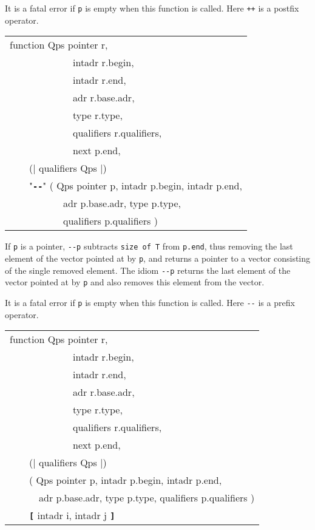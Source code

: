 \documentclass[12pt]{article}
\makeatletter
\newcommand{\TT}[1]{{\tt \bfseries #1}}
\newcommand{\ttmkey}[2]{\TT{#1}\index{#1@{\tt #1}!#2}}
\newcommand{\ttmindex}[2]{\index{#1@{\tt #1}!#2}}
\newenvironment{indpar}[1][0.3in]%
	{\begin{list}{}%
		     {\setlength{\itemsep}{0in}%
		      \setlength{\topsep}{0in}%
		      \setlength{\parsep}{1ex}%
		      \setlength{\labelwidth}{#1}%
		      \setlength{\leftmargin}{#1}%
		      \addtolength{\leftmargin}{\labelsep}}%
	 \item}%
	{\end{list}}
\makeatother
\begin{document}
\begin{indpar}
\begin{indpar}
It is a fatal error if {\tt p} is empty when this function is
called.  Here {\tt ++} is a postfix operator.
\end{indpar}

{\tt\begin{tabular}{@{}l}
function Qps pointer r, \\
~~~~~~~~~~~~~intadr r.begin, \\
~~~~~~~~~~~~~intadr r.end, \\
~~~~~~~~~~~~~adr r.base.adr, \\
~~~~~~~~~~~~~type r.type, \\
~~~~~~~~~~~~~qualifiers r.qualifiers, \\
~~~~~~~~~~~~~next p.end, \\
~~~~(| qualifiers Qps |) \\
~~~~"\ttmkey{-{}-}{of pointer}"
         ( Qps pointer p, intadr p.begin, intadr p.end, \\
~~~~~~~~~~~adr p.base.adr, type p.type, \\
~~~~~~~~~~~qualifiers p.qualifiers ) \\
\end{tabular}}

\begin{indpar}
If {\tt p} is a pointer, {\tt -{}-p} subtracts {\tt size of T} from {\tt p.end},
thus removing the last element of the vector pointed at by {\tt p},
and returns a pointer to a vector consisting of the single removed element.
The idiom {\tt *-{}-p} returns the last element of the vector
pointed at by {\tt p} and also removes this element from the vector.

It is a fatal error if {\tt p} is empty when this function is
called.  Here {\tt -{}-} is a prefix operator.
\end{indpar}

{\tt\begin{tabular}{@{}l}
function Qps pointer r, \\
~~~~~~~~~~~~~intadr r.begin, \\
~~~~~~~~~~~~~intadr r.end, \\
~~~~~~~~~~~~~adr r.base.adr, \\
~~~~~~~~~~~~~type r.type, \\
~~~~~~~~~~~~~qualifiers r.qualifiers, \\
~~~~~~~~~~~~~next p.end, \\
~~~~(| qualifiers Qps |) \\
~~~~( Qps pointer p, intadr p.begin, intadr p.end, \\
~~~~~~adr p.base.adr, type p.type, qualifiers p.qualifiers ) \\
~~~~\TT{[} intadr i, intadr j \TT{]}\ttmindex{[]}{subvector} \\
\end{tabular}}


\end{indpar}
\end{document}
